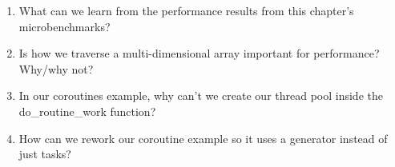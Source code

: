 \begin{enumerate}
\item
What can we learn from the performance results from this chapter's microbenchmarks?

\item
Is how we traverse a multi-dimensional array important for performance? Why/why not?

\item
In our coroutines example, why can't we create our thread pool inside the do\_routine\_work function?

\item
How can we rework our coroutine example so it uses a generator instead of just tasks?
\end{enumerate}